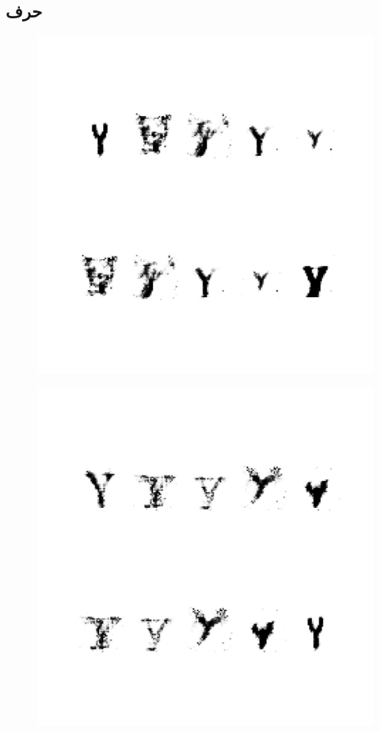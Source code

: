\documentclass{article}
\begin{document}
\subsection{حرف }
\begin{figure}[H]
	\centerline{\includegraphics[width=\textwidth , height=\textheight ]{../results/CGAN_Adam/figs/letters/Y/95.pdf}}
\end{figure}
\begin{figure}[H]
	\centerline{\includegraphics[width=\textwidth , height=\textheight ]{../results/CGAN_Adam/figs/letters/Y/90.pdf}}
\end{figure}
\end{document}
